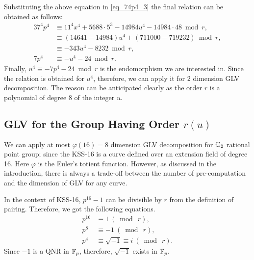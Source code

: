 Substituting the above equation in \eqref{eq_74p4_3} the final relation can be obtained as follows:
\begin{alignat}{3}
 7^4p^4  & \equiv 11^4x^4 + 5688 \cdot 5^3 - 14984 u^{4} - 14984 \cdot 48 \bmod r, \nonumber \\
  &\equiv  (14641-14984)u^4 + (711000-719232) \bmod r, \nonumber \\
  & \equiv  -343 u^4 -8232 \bmod r, \nonumber \\
  7p^4 & \equiv  -u^4 -24 \bmod r.  \label{eq_p_u_relation}
\end{alignat}
Finally, $u^4 \equiv -7p^4-24 \bmod r$ is the endomorphism we are interested in.
Since the relation is obtained for $u^4$, therefore, we can apply it for 2 dimension GLV decomposition.
The reason can be anticipated clearly as the order $r$ is a polynomial of degree 8 of the integer $u$.

\subsection{GLV for the Group Having Order \texorpdfstring{$r(u)$}{}}
We can apply at most $\varphi(16)= 8$ dimension GLV decomposition for ${\mathbb{G}}_{2}$ rational point group; since the KSS-16 is a curve defined over an extension field of degree 16.
Here $\varphi$ is the Euler's totient function.
However, as discussed in the introduction, there is always a trade-off between the number of pre-computation and the dimension of GLV for any curve. 

In the context of KSS-16, $p^{16}-1$ can be divisible by $r$ from the definition of pairing.  Therefore, we got the following equations.
\begin{subequations}
\begin{alignat}{3}
p^{16} &\equiv 1~(\bmod~r), \\
\label{p8_m1}
p^{8}&\equiv -1~(\bmod~r),\\
\label{p4_i}
p^{4} &\equiv \sqrt{-1} \equiv i~(\bmod~r).
\end{alignat}
\end{subequations}
Since $-1$ is a QNR in $\mathbb{F}_p$, therefore, $\sqrt{-1}$ exists in ${\mathbb{F}}_{p}$. 

